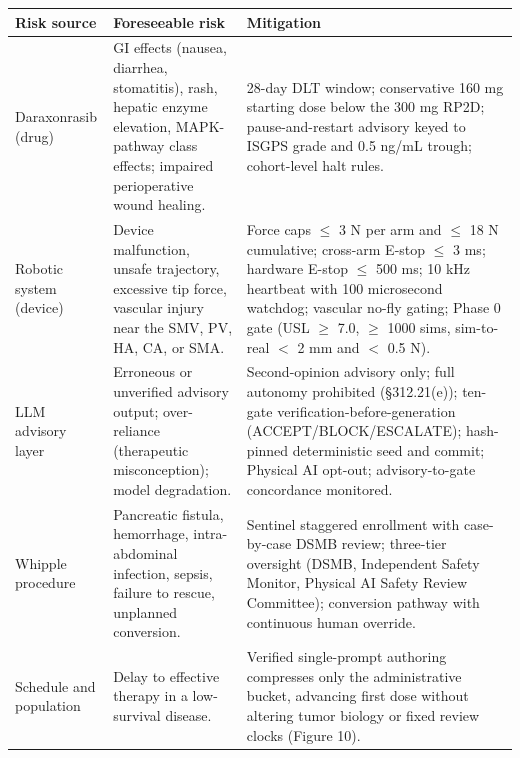 \noindent\begin{tabularx}{\textwidth}{L{3.4cm} Y Y}
\toprule
\textbf{Risk source} & \textbf{Foreseeable risk} & \textbf{Mitigation} \\
\midrule
Daraxonrasib (drug) & GI effects (nausea, diarrhea, stomatitis), rash, hepatic enzyme elevation, MAPK-pathway class effects; impaired perioperative wound healing. & 28-day DLT window; conservative 160 mg starting dose below the 300 mg RP2D; pause-and-restart advisory keyed to ISGPS grade and 0.5 ng/mL trough; cohort-level halt rules. \\
\addlinespace
Robotic system (device) & Device malfunction, unsafe trajectory, excessive tip force, vascular injury near the SMV, PV, HA, CA, or SMA. & Force caps $\leq$ 3 N per arm and $\leq$ 18 N cumulative; cross-arm E-stop $\leq$ 3 ms; hardware E-stop $\leq$ 500 ms; 10 kHz heartbeat with 100 microsecond watchdog; vascular no-fly gating; Phase 0 gate (USL $\geq$ 7.0, $\geq$ 1000 sims, sim-to-real $<$ 2 mm and $<$ 0.5 N). \\
\addlinespace
LLM advisory layer & Erroneous or unverified advisory output; over-reliance (therapeutic misconception); model degradation. & Second-opinion advisory only; full autonomy prohibited (\S 312.21(e)); ten-gate verification-before-generation (ACCEPT/BLOCK/ESCALATE); hash-pinned deterministic seed and commit; Physical AI opt-out; advisory-to-gate concordance monitored. \\
\addlinespace
Whipple procedure & Pancreatic fistula, hemorrhage, intra-abdominal infection, sepsis, failure to rescue, unplanned conversion. & Sentinel staggered enrollment with case-by-case DSMB review; three-tier oversight (DSMB, Independent Safety Monitor, Physical AI Safety Review Committee); conversion pathway with continuous human override. \\
\addlinespace
Schedule and population & Delay to effective therapy in a low-survival disease. & Verified single-prompt authoring compresses only the administrative bucket, advancing first dose without altering tumor biology or fixed review clocks (Figure 10). \\
\bottomrule
\end{tabularx}

